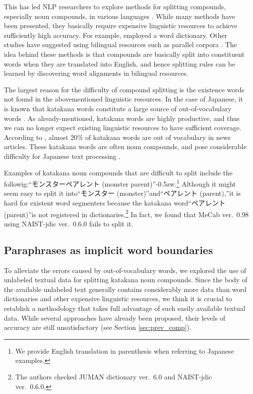 \documentclass[english]{jnlp_1.4_rep}
\begin{document}
This has led NLP researchers to explore methods for splitting compounds,
especially noun compounds, in various languages
\cite{Koehn03,Nakazawa05,AlfonsecaACL08}. While many methods have been
presented, they basically require expensive linguistic resources to
achieve sufficiently high accuracy. For example, 
     employed a word dictionary. 
Other studies have suggested using bilingual resources such as parallel
corpora \cite{Brown02,Koehn03,Nakazawa05}. The idea behind these methods
is that compounds are basically split into constituent words when they
are translated into English, and hence splitting rules can be learned by
discovering word alignments in bilingual resources.

The largest reason for the difficulty of compound splitting is the
existence words not found in the abovementioned linguistic resources. In
the case of Japanese, it is known that katakana words constitute a large
source of out-of-vocabulary words \cite{Brill01,Nakazawa05,Breen09}. As
already-mentioned, katakana words are highly productive, and thus we can
no longer expect existing linguistic resources to have sufficient
coverage. According to , almost 20\% of katakana words are
out of vocabulary in news articles. These katakana words are often noun
compounds, and pose considerable difficulty for Japanese text processing
\cite{Nakazawa05}.

Examples of katakana noun compounds that are difficult to split include
the followig:“モンスターペアレント (monster parent)”{\kern-0.5zw}.\footnote{We provide English translation in parenthesis when referring
to Japanese examples.}
Although it might seem easy to split it into“モンスター (monster)”and“ペアレント (parent),”it is hard for existent word segmenters
because the katakana word“ペアレント (parent)”is not registered in
dictionaries.\footnote{The authors checked JUMAN dictionary ver.~6.0 and NAIST-jdic
ver.~0.6.0.} In fact, we found that MeCab ver.~0.98 using NAIST-jdic
ver.~0.6.0 fails to split it.


\subsection{Paraphrases as implicit word boundaries}

To alleviate the errors caused by out-of-vocabulary words, we explored
the use of unlabeled textual data for splitting katakana noun compounds.
Since the body of the available unlabeled text generally contains
considerably more data than word dictionaries and other expensive
linguistic resources, we think it is crucial to establish a methodology
that takes full advantage of such easily available textual data. While
several approaches have already been proposed, their levels of accuracy
are still unsatisfactory (see Section \ref{sec:prev_comp}).
\end{document}
